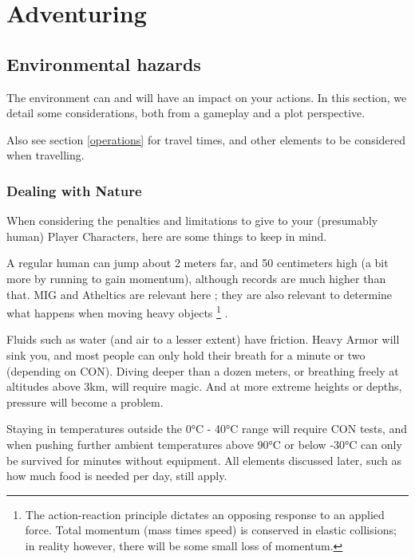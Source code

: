 \chapter{Adventuring}

\section{Environmental hazards}

\label{hazards}


The environment can and will have an impact on your actions. In this section, we detail some considerations, both from a gameplay and a plot perspective.


\begin{rpg-examplebox}
	Also see section \ref{operations} for travel times, and other elements to be considered when travelling.
\end{rpg-examplebox}



\subsection{Dealing with Nature}

When considering the penalties and limitations to give to your (presumably human) Player Characters, here are some things to keep in mind.

A regular human can jump about 2 meters far, and 50 centimeters high (a bit more by running to gain momentum), although records are much higher than that. MIG and Atheltics are relevant here ; they are also relevant to determine what happens when moving heavy objects
\footnote{The action-reaction principle dictates an opposing response to an applied force. Total momentum (mass times speed) is conserved in elastic collisions; in reality however, there will be some small loss of momentum.}
.

Fluids such as water (and air to a lesser extent) have friction. Heavy Armor will sink you, and most people can only hold their breath for a minute or two (depending on CON). Diving deeper than a dozen meters, or breathing freely at altitudes above 3km, will require magic. And at more extreme heights or depths, pressure will become a problem.

Staying in temperatures outside the 0°C - 40°C range will require CON tests, and when pushing further ambient temperatures above 90°C or below -30°C can only be survived for minutes without equipment. All elements discussed later, such as how much food is needed per day, still apply.

